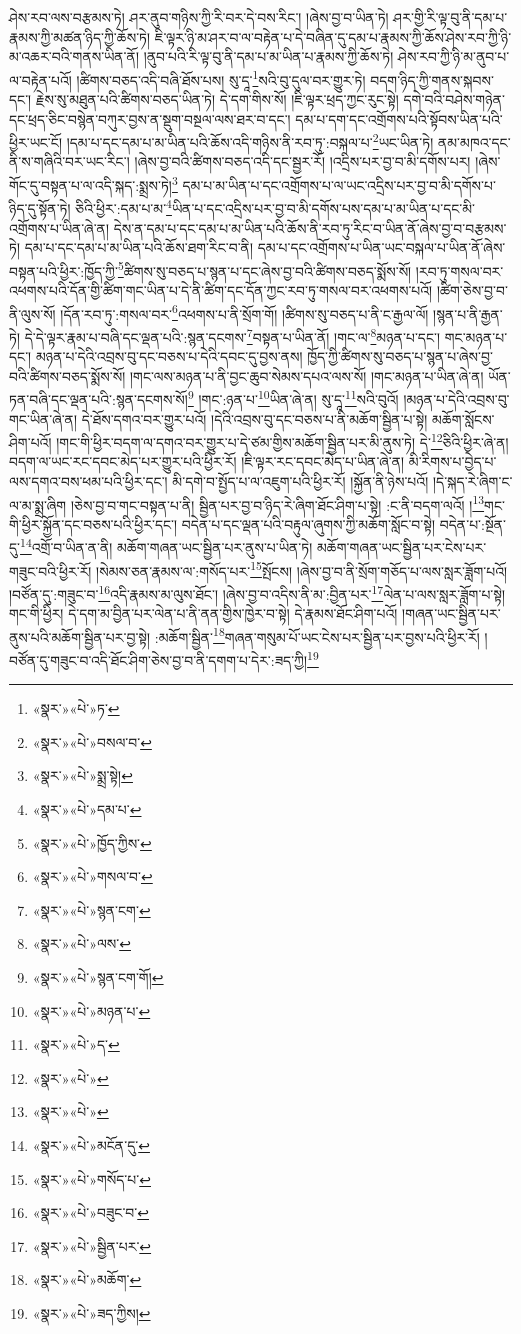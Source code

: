 ཤེས་རབ་ལས་བརྩམས་ཏེ། ཤར་ནུབ་གཉིས་ཀྱི་རི་བར་དེ་བས་རིང་། །ཞེས་བྱ་བ་ཡིན་ཏེ། ཤར་གྱི་རི་ལྟ་བུ་ནི་དམ་པ་རྣམས་ཀྱི་མཚན་ཉིད་ཀྱི་ཆོས་ཏེ། ཇི་ལྟར་ཉི་མ་ཤར་བ་ལ་བརྟེན་པ་དེ་བཞིན་དུ་དམ་པ་རྣམས་ཀྱི་ཆོས་ཤེས་རབ་ཀྱི་ཉི་མ་འཆར་བའི་གནས་ཡིན་ནོ། །ནུབ་པའི་རི་ལྟ་བུ་ནི་དམ་པ་མ་ཡིན་པ་རྣམས་ཀྱི་ཆོས་ཏེ། ཤེས་རབ་ཀྱི་ཉི་མ་ནུབ་པ་ལ་བརྟེན་པའོ། །ཚིགས་བཅད་འདི་བཞི་ཐོས་པས། སུ་དཱ་\footnote{«སྣར་»«པེ་»ཏ་}སའི་བུ་དུལ་བར་གྱུར་ཏེ། བདག་ཉིད་ཀྱི་གནས་སྐབས་དང་། རྗེས་སུ་མཐུན་པའི་ཚིགས་བཅད་ཡིན་ཏེ། དེ་དག་གིས་སོ། །ཇི་ལྟར་ཕྲད་ཀྱང་རུང་སྟེ། དགེ་བའི་བཤེས་གཉེན་དང་ཕྲད་ཅིང་བསྙེན་བཀུར་བྱས་ན་སྡུག་བསྔལ་ལས་ཐར་བ་དང་། དམ་པ་དག་དང་འགྲོགས་པའི་སྟོབས་ཡིན་པའི་ཕྱིར་ཡང་ངོ། །དམ་པ་དང་དམ་པ་མ་ཡིན་པའི་ཆོས་འདི་གཉིས་ནི་རབ་ཏུ་:བསྐལ་པ་\footnote{«སྣར་»«པེ་»བསལ་བ་}ཡང་ཡིན་ཏེ། ནམ་མཁའ་དང་ནི་ས་གཞིའི་བར་ཡང་རིང་། །ཞེས་བྱ་བའི་ཚིགས་བཅད་འདི་དང་སྦྱར་རོ། །འདྲིས་པར་བྱ་བ་མི་དགོས་པར། །ཞེས་གོང་དུ་བསྟན་པ་ལ་འདི་སྐད་:སྨྲས་ཏེ།\footnote{«སྣར་»«པེ་»སྨྲ་སྟེ།} དམ་པ་མ་ཡིན་པ་དང་འགྲོགས་པ་ལ་ཡང་འདྲིས་པར་བྱ་བ་མི་དགོས་པ་ཉིད་དུ་སྟོན་ཏེ། ཅིའི་ཕྱིར་:དམ་པ་མ་\footnote{«སྣར་»«པེ་»དམ་པ་}ཡིན་པ་དང་འདྲིས་པར་བྱ་བ་མི་དགོས་པས་དམ་པ་མ་ཡིན་པ་དང་མི་འགྲོགས་པ་ཡིན་ཞེ་ན། དེས་ན་དམ་པ་དང་དམ་པ་མ་ཡིན་པའི་ཆོས་ནི་རབ་ཏུ་རིང་བ་ཡིན་ནོ་ཞེས་བྱ་བ་བརྩམས་ཏེ། དམ་པ་དང་དམ་པ་མ་ཡིན་པའི་ཆོས་ཐག་རིང་བ་ནི། དམ་པ་དང་འགྲོགས་པ་ཡིན་ཡང་བསྐལ་པ་ཡིན་ནོ་ཞེས་བསྟན་པའི་ཕྱིར་:ཁྱོད་ཀྱི་\footnote{«སྣར་»«པེ་»ཁྱོད་ཀྱིས་}ཚིགས་སུ་བཅད་པ་སྙན་པ་དང་ཞེས་བྱ་བའི་ཚིགས་བཅད་སྨོས་སོ། །རབ་ཏུ་གསལ་བར་འཕགས་པའི་དོན་གྱི་ཚིག་གང་ཡིན་པ་དེ་ནི་ཚིག་དང་དོན་ཀྱང་རབ་ཏུ་གསལ་བར་འཕགས་པའོ། །ཚིག་ཅེས་བྱ་བ་ནི་ལུས་སོ། །དོན་རབ་ཏུ་:གསལ་བར་\footnote{«སྣར་»«པེ་»གསལ་བ་}འཕགས་པ་ནི་སྲོག་གོ། །ཚིགས་སུ་བཅད་པ་ནི་ང་རྒྱལ་ལོ། །སྙན་པ་ནི་རྒྱན་ཏེ། དེ་དེ་ལྟར་རྣམ་པ་བཞི་དང་ལྡན་པའི་:སྙན་དངགས་\footnote{«སྣར་»«པེ་»སྙན་ངག་}བསྟན་པ་ཡིན་ནོ། །གང་ལ་\footnote{«སྣར་»«པེ་»ལས་}མཉན་པ་དང་། གང་མཉན་པ་དང་། མཉན་པ་དེའི་འབྲས་བུ་དང་བཅས་པ་དེའི་དབང་དུ་བྱས་ནས། ཁྱོད་ཀྱི་ཚིགས་སུ་བཅད་པ་སྙན་པ་ཞེས་བྱ་བའི་ཚིགས་བཅད་སྨོས་སོ། །གང་ལས་མཉན་པ་ནི་བྱང་ཆུབ་སེམས་དཔའ་ལས་སོ། །གང་མཉན་པ་ཡིན་ཞེ་ན། ཡོན་ཏན་བཞི་དང་ལྡན་པའི་:སྙན་དངགས་སོ།\footnote{«སྣར་»«པེ་»སྙན་ངག་གོ།} །གང་:ཉན་པ་\footnote{«སྣར་»«པེ་»མཉན་པ་}ཡིན་ཞེ་ན། སུ་དཱ་\footnote{«སྣར་»«པེ་»ད་}སའི་བུའོ། །མཉན་པ་དེའི་འབྲས་བུ་གང་ཡིན་ཞེ་ན། དེ་ཐོས་དགའ་བར་གྱུར་པའོ། །དེའི་འབྲས་བུ་དང་བཅས་པ་ནི་མཆོག་སྦྱིན་པ་སྟེ། མཆོག་སློངས་ཤིག་པའོ། །གང་གི་ཕྱིར་བདག་ལ་དགའ་བར་གྱུར་པ་དེ་ཙམ་གྱིས་མཆོག་སྦྱིན་པར་མི་ནུས་ཏེ། དེ་\footnote{«སྣར་»«པེ་»}ཅིའི་ཕྱིར་ཞེ་ན། བདག་ལ་ཡང་རང་དབང་མེད་པར་གྱུར་པའི་ཕྱིར་རོ། །ཇི་ལྟར་རང་དབང་མེད་པ་ཡིན་ཞེ་ན། མི་རིགས་པ་བྱེད་པ་ལས་དགའ་བས་ཕམ་པའི་ཕྱིར་དང་། མི་དགེ་བ་སྤྱོད་པ་ལ་འཇུག་པའི་ཕྱིར་རོ། །སྐྱོན་ནི་ཉེས་པའོ། །དེ་སྐད་རེ་ཞིག་ང་ལ་མ་སྨྲ་ཞིག །ཅེས་བྱ་བ་གང་བསྟན་པ་ནི། སྦྱིན་པར་བྱ་བ་ཉིད་རེ་ཞིག་ཐོང་ཤིག་པ་སྟེ། :ང་ནི་བདག་ལའོ། །\footnote{«སྣར་»«པེ་»}གང་གི་ཕྱིར་སྐྱོན་དང་བཅས་པའི་ཕྱིར་དང་། བདེན་པ་དང་ལྡན་པའི་བརྟུལ་ཞུགས་ཀྱི་མཆོག་སློང་བ་སྟེ། བདེན་པ་:སྔོན་དུ་\footnote{«སྣར་»«པེ་»མངོན་དུ་}འགྲོ་བ་ཡིན་ན་ནི། མཆོག་གཞན་ཡང་སྦྱིན་པར་ནུས་པ་ཡིན་ཏེ། མཆོག་གཞན་ཡང་སྦྱིན་པར་ངེས་པར་གཟུང་བའི་ཕྱིར་རོ། །སེམས་ཅན་རྣམས་ལ་:གསོད་པར་\footnote{«སྣར་»«པེ་»གསོད་པ་}སྤོངས། །ཞེས་བྱ་བ་ནི་སྲོག་གཅོད་པ་ལས་སླར་ཟློག་པའོ། །བཙོན་དུ་:གཟུང་བ་\footnote{«སྣར་»«པེ་»བཟུང་བ་}འདི་རྣམས་མ་ལུས་ཐོང་། །ཞེས་བྱ་བ་འདིས་ནི་མ་:བྱིན་པར་\footnote{«སྣར་»«པེ་»སྦྱིན་པར་}ལེན་པ་ལས་སླར་ཟློག་པ་སྟེ། གང་གི་ཕྱིར། དེ་དག་མ་བྱིན་པར་ལེན་པ་ནི་ནན་གྱིས་ཁྱེར་བ་སྟེ། དེ་རྣམས་ཐོང་ཤིག་པའོ། །གཞན་ཡང་སྦྱིན་པར་ནུས་པའི་མཆོག་སྦྱིན་པར་བྱ་སྟེ། :མཆོག་སྦྱིན་\footnote{«སྣར་»«པེ་»མཆོག་}གཞན་གསུམ་པོ་ཡང་ངེས་པར་སྦྱིན་པར་བྱས་པའི་ཕྱིར་རོ། །བཙོན་དུ་གཟུང་བ་འདི་ཐོང་ཤིག་ཅེས་བྱ་བ་ནི་དགག་པ་དེར་:ཟད་ཀྱི།\footnote{«སྣར་»«པེ་»ཟད་ཀྱིས།} 